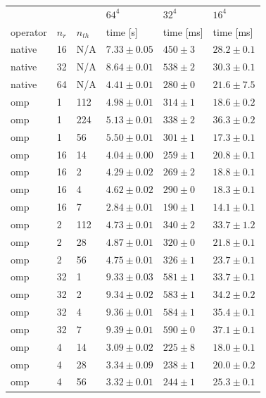 \documentclass{article}
\theoremstyle{plain} %
\theoremstyle{convention} %
\theoremstyle{remark} %
\numberwithin{equation}{section}
\begin{document}
\begin{table}
    \centering
    \begin{tabular}{ |p{1.5cm}||p{1cm}|p{1cm}|p{2cm}|p{2cm}|p{2cm}| }
        \hline
        & & & $64^4$ & $32^4$ & $16^4$ \\
        operator & $n_r$ & $n_{th}$ & time [s] & time [ms] & time [ms] \\
        \hline
        native & 16 & N/A & $7.33 \pm 0.05$ & $450 \pm 3$ & $28.2 \pm 0.1$ \\
        native & 32 & N/A & $8.64 \pm 0.01$ & $538 \pm 2$ & $30.3 \pm 0.1$ \\
        native & 64 & N/A & $4.41 \pm 0.01$ & $280 \pm 0$ & $21.6 \pm 7.5$ \\
        omp & 1 & 112 & $4.98 \pm 0.01$ & $314 \pm 1$ & $18.6 \pm 0.2$ \\
        omp & 1 & 224 & $5.13 \pm 0.01$ & $338 \pm 2$ & $36.3 \pm 0.2$ \\
        omp & 1 & 56 & $5.50 \pm 0.01$ & $301 \pm 1$ & $17.3 \pm 0.1$ \\
        omp & 16 & 14 & $4.04 \pm 0.00$ & $259 \pm 1$ & $20.8 \pm 0.1$ \\
        omp & 16 & 2 & $4.29 \pm 0.02$ & $269 \pm 2$ & $18.8 \pm 0.1$ \\
        omp & 16 & 4 & $4.62 \pm 0.02$ & $290 \pm 0$ & $18.3 \pm 0.1$ \\
        omp & 16 & 7 & $2.84 \pm 0.01$ & $190 \pm 1$ & $14.1 \pm 0.1$ \\
        omp & 2 & 112 & $4.73 \pm 0.01$ & $340 \pm 2$ & $33.7 \pm 1.2$ \\
        omp & 2 & 28 & $4.87 \pm 0.01$ & $320 \pm 0$ & $21.8 \pm 0.1$ \\
        omp & 2 & 56 & $4.75 \pm 0.01$ & $326 \pm 1$ & $23.7 \pm 0.1$ \\
        omp & 32 & 1 & $9.33 \pm 0.03$ & $581 \pm 1$ & $33.7 \pm 0.1$ \\
        omp & 32 & 2 & $9.34 \pm 0.02$ & $583 \pm 1$ & $34.2 \pm 0.2$ \\
        omp & 32 & 4 & $9.36 \pm 0.01$ & $584 \pm 1$ & $35.4 \pm 0.1$ \\
        omp & 32 & 7 & $9.39 \pm 0.01$ & $590 \pm 0$ & $37.1 \pm 0.1$ \\
        omp & 4 & 14 & $3.09 \pm 0.02$ & $225 \pm 8$ & $18.0 \pm 0.1$ \\
        omp & 4 & 28 & $3.34 \pm 0.09$ & $238 \pm 1$ & $20.0 \pm 0.2$ \\
        omp & 4 & 56 & $3.32 \pm 0.01$ & $244 \pm 1$ & $25.3 \pm 0.1$ \\

\end{tabular}
\end{table}
\end{document}
